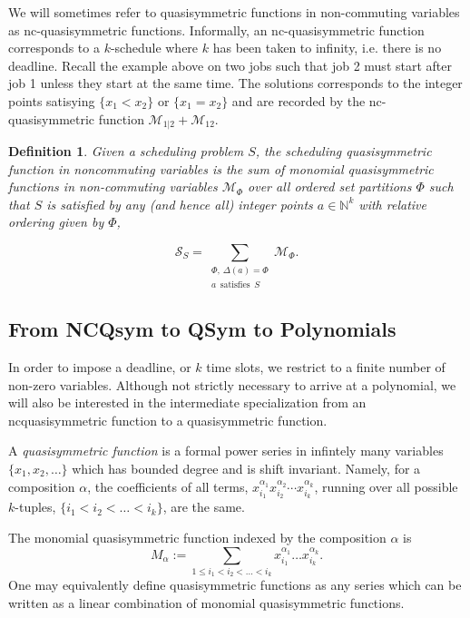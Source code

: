 \documentclass[12pt,reqno]{amsart}
\newtheorem{definition}{Definition}
\numberwithin{definition}{section}
\theoremstyle{definition}
\newcommand{\ncS}{\mathcal{S}}
\newcommand{\ncM}{\mathcal{M}}
\begin{document}
We will sometimes refer to quasisymmetric functions in non-commuting
variables as nc-quasisymmetric functions.  Informally, an
nc-quasisymmetric function corresponds to a $k$-schedule where $k$ has
been taken to infinity, i.e. there is no deadline.  Recall the example
above on two jobs such that job 2 must start after job 1 unless they
start at the same time.  The solutions corresponds to the integer points satisying $\{x_1 < x_2\}$ or $\{x_1 = x_2\}$ and are recorded by the
nc-quasisymmetric function $\ncM_{1|2} + \ncM_{12}$.

\begin{definition}
Given a scheduling problem $S$, the scheduling quasisymmetric function in noncommuting variables is the sum of monomial quasisymmetric functions in non-commuting variables $\ncM_{\Phi}$ over all ordered set partitions ${\Phi}$ such that $S$ is satisfied by any (and hence all) integer points $a \in \mathbb{N}^k$ with relative ordering given by $\Phi$,

$$ \ncS_S = \sum_{\substack{\Phi, \, \Delta(a) =\Phi \\ a \, {\operatorname{satisfies}} \,S}} \ncM_{\Phi}. $$

\end{definition}





\subsection{From NCQsym to QSym to Polynomials}


 In order to impose a deadline, or $k$ time slots, we restrict to
 a finite number of non-zero variables.
Although not strictly necessary to arrive at a polynomial, we will also be interested in the intermediate specialization from an ncquasisymmetric function to a quasisymmetric function.  


A \emph{quasisymmetric function} is a formal power series in infintely many
variables $\{x_1, x_2, \ldots \}$ which has bounded degree and is shift invariant.  Namely, for
a composition $\alpha$, the coefficients of all terms,
$x_{i_1}^{\alpha_1}x_{i_2}^{\alpha_2} \cdots x_{i_k}^{\alpha_k}$,
running over all possible $k$-tuples, $\{i_1 < i_2 < \ldots < i_k \}$, are
the same.


The monomial quasisymmetric function indexed by the composition $\alpha$ is 
$$M_{\alpha} := \sum_{1 \leq i_1 < i_2 < \ldots < i_k}
x_{i_1}^{\alpha_1} \ldots x_{i_k}^{\alpha_k}.$$  One may equivalently
define quasisymmetric functions as any series which can be written as a
linear combination of monomial quasisymmetric functions.
\end{document}
